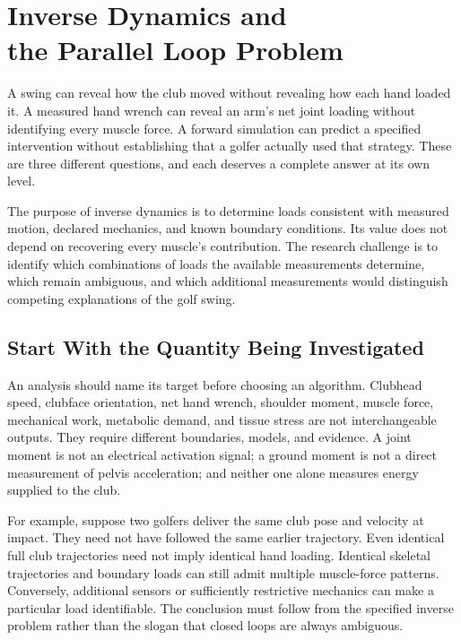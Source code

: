 \chapter[Inverse Dynamics and the Parallel Loop Problem]{Inverse Dynamics and\\the Parallel Loop Problem}
\label{ch:inverse_dynamics_parallel}

A swing can reveal how the club moved without revealing how each hand loaded it.
A measured hand wrench can reveal an arm's net joint loading without identifying
every muscle force. A forward simulation can predict a specified intervention
without establishing that a golfer actually used that strategy. These are three
different questions, and each deserves a complete answer at its own level.

The purpose of inverse dynamics is to determine loads consistent with measured
motion, declared mechanics, and known boundary conditions. Its value does not
depend on recovering every muscle's contribution. The research challenge is to
identify which combinations of loads the available measurements determine, which
remain ambiguous, and which additional measurements would distinguish competing
explanations of the golf swing.

\section{Start With the Quantity Being Investigated}
\label{sec:inverse_definition}

An analysis should name its target before choosing an algorithm. Clubhead speed,
clubface orientation, net hand wrench, shoulder moment, muscle force, mechanical
work, metabolic demand, and tissue stress are not interchangeable outputs.
They require different boundaries, models, and evidence. A joint moment is not
an electrical activation signal; a ground moment is not a direct measurement of
pelvis acceleration; and neither one alone measures energy supplied to the club.

For example, suppose two golfers deliver the same club pose and velocity at
impact. They need not have followed the same earlier trajectory. Even identical
full club trajectories need not imply identical hand loading. Identical
skeletal trajectories and boundary loads can still admit multiple muscle-force
patterns. Conversely, additional sensors or sufficiently restrictive mechanics
can make a particular load identifiable. The conclusion must follow from the
specified inverse problem rather than the slogan that closed loops are always
ambiguous.

